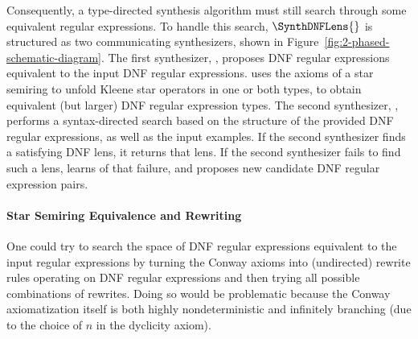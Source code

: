 \documentclass[acmsmall,screen]{acmart}
\begin{document}
Consequently, a type-directed synthesis algorithm must still search through
some equivalent regular expressions.
To handle this search, $\SynthDNFLens{}$ is structured as two
communicating synthesizers, shown in Figure~\ref{fig:2-phased-schematic-diagram}.
The first synthesizer, \TypeProp{}, proposes DNF regular expressions
equivalent to the input DNF regular expressions.
\TypeProp{} uses the axioms of a star semiring to unfold Kleene star
operators in one or both types, to obtain equivalent (but larger) DNF regular
expression types. The second synthesizer, \RigidSynth{}, performs a
syntax-directed search based on the structure of the provided DNF regular
expressions, as well as the input examples. If the second synthesizer finds a
satisfying DNF lens, it returns that lens.  If the second synthesizer fails to
find such a lens, \TypeProp{} learns of that failure,
and proposes new candidate DNF regular expression pairs.

\paragraph*{Star Semiring Equivalence and Rewriting}

One could try to search the space of DNF regular expressions equivalent to
the input regular expressions by turning the Conway axioms into (undirected)
rewrite rules operating on DNF regular expressions
and then trying all possible combinations of rewrites.  Doing so would
be problematic because the Conway axiomatization itself is both highly
nondeterministic and infinitely branching (due to the choice of $n$ in
the dyclicity axiom).
\end{document}
